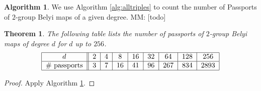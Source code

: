 \documentclass{dcthesis}
\newcommand{\mm}[1]{{\color{blue} \sf MM: [#1]}}
\newtheorem{theorem}[prop]{Theorem}
\theoremstyle{definition}
\newtheorem{alg}[prop]{Algorithm}
\theoremstyle{remark}
\numberwithin{equation}{section}
\numberwithin{figure}{section}
\begin{document}
{{    \begin{alg}\label{alg:allpassports}
      We use Algorithm \ref{alg:alltriples}
      to count the number of Passports of $2$-group Belyi maps
      of a given degree.
      \mm{todo}
    \end{alg}
    \begin{theorem}\label{thm:passports}
      The following table lists the number of passports of
      $2$-group Belyi maps of degree $d$ for $d$ up to $256$.
      \[
        \begin{tabular}{|c||c|c|c|c|c|c|c|c|}
          \hline
          $d$ & $2$ & $4$ & $8$ & $16$ & $32$ & $64$ & $128$ & $256$\\
          \hline
          \# passports & $3$ & $7$ & $16$ & $41$ & $96$ & $267$ & $834$ & $2893$\\
          \hline
        \end{tabular}
      \]
    \end{theorem}
    \begin{proof}
      Apply Algorithm \ref{alg:allpassports}.
    \end{proof}
  }
}
\end{document}
